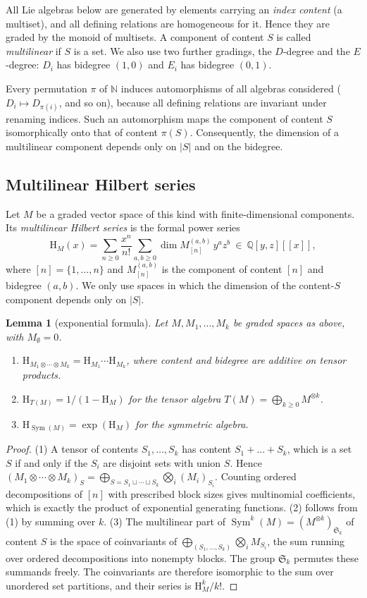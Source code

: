 \documentclass[11pt]{amsart}
\newtheorem{lemma}[theorem]{Lemma}
\theoremstyle{definition}
\theoremstyle{remark}
\newcommand{\N}{\mathbb{N}}
\newcommand{\Q}{\mathbb{Q}}
\newcommand{\Hs}{\mathrm{H}}
\newcommand{\Sym}{\operatorname{Sym}}
\begin{document}
All Lie algebras below are generated by elements carrying an \emph{index content} (a multiset), and all defining relations are homogeneous for it. Hence they are graded by the monoid of multisets. A component of content $S$ is called \emph{multilinear} if $S$ is a set. We also use two further gradings, the $D$-degree and the $E$-degree: $D_i$ has bidegree $(1,0)$ and $E_i$ has bidegree $(0,1)$.

Every permutation $\pi$ of $\N$ induces automorphisms of all algebras considered ($D_i\mapsto D_{\pi(i)}$, and so on), because all defining relations are invariant under renaming indices. Such an automorphism maps the component of content $S$ isomorphically onto that of content $\pi(S)$. Consequently, the dimension of a multilinear component depends only on $|S|$ and on the bidegree.

\subsection{Multilinear Hilbert series}
Let $M$ be a graded vector space of this kind with finite-dimensional components. Its \emph{multilinear Hilbert series} is the formal power series
\[
\Hs_M(x)=\sum_{n\ge0}\frac{x^n}{n!}\sum_{a,b\ge0}\dim M_{[n]}^{(a,b)}\,y^az^b\ \in\ \Q[y,z][[x]],
\]
where $[n]=\{1,\dots,n\}$ and $M_{[n]}^{(a,b)}$ is the component of content $[n]$ and bidegree $(a,b)$. We only use spaces in which the dimension of the content-$S$ component depends only on $|S|$.

\begin{lemma}[exponential formula]\label{lem:exp}
Let $M,M_1,\dots,M_k$ be graded spaces as above, with $M_\emptyset=0$.
\begin{enumerate}
\item $\Hs_{M_1\otimes\cdots\otimes M_k}=\Hs_{M_1}\cdots\Hs_{M_k}$, where content and bidegree are additive on tensor products.
\item $\Hs_{T(M)}=1/(1-\Hs_M)$ for the tensor algebra $T(M)=\bigoplus_{k\ge0}M^{\otimes k}$.
\item $\Hs_{\Sym(M)}=\exp(\Hs_M)$ for the symmetric algebra.
\end{enumerate}
\end{lemma}

\begin{proof}
(1) A tensor of contents $S_1,\dots,S_k$ has content $S_1+\dots+S_k$, which is a set $S$ if and only if the $S_i$ are disjoint sets with union $S$. Hence $(M_1\otimes\cdots\otimes M_k)_S=\bigoplus_{S=S_1\sqcup\cdots\sqcup S_k}\bigotimes_i(M_i)_{S_i}$. Counting ordered decompositions of $[n]$ with prescribed block sizes gives multinomial coefficients, which is exactly the product of exponential generating functions.
(2) follows from (1) by summing over $k$.
(3) The multilinear part of $\Sym^k(M)=(M^{\otimes k})_{\mathfrak S_k}$ of content $S$ is the space of coinvariants of $\bigoplus_{(S_1,\dots,S_k)}\bigotimes_i M_{S_i}$, the sum running over ordered decompositions into nonempty blocks. The group $\mathfrak S_k$ permutes these summands freely. The coinvariants are therefore isomorphic to the sum over unordered set partitions, and their series is $\Hs_M^k/k!$.
\end{proof}
\end{document}
